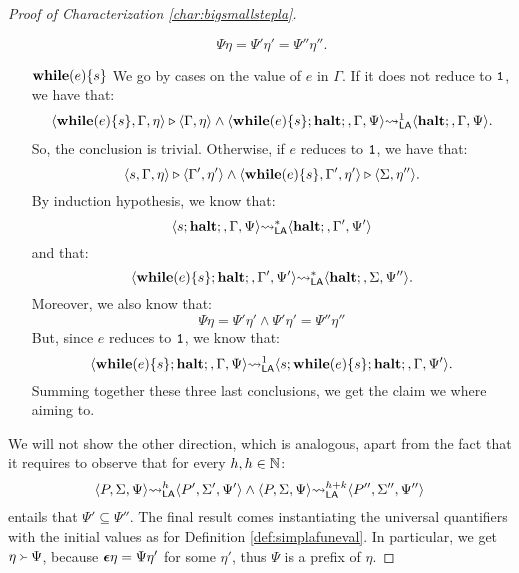 \begin{proof}[Proof of Characterization \ref{char:bigsmallstepla}]
\begin{itemize}
    $$
    \Psi\eta = \Psi'\eta'=\Psi''\eta''.
    $$
    \item[$\mathbf{while}(e)\{s\}$] We go by cases on the value of $e$ in $\Gamma$. If it does
    not reduce to $\mathtt{1}$, we have that:
    $$
    \begin{gathered}
      \langle \mathbf{while}(e)\{s\}, \Gamma, \eta\rangle \triangleright \langle \Gamma, \eta\rangle \land
      \langle \mathbf{while}(e)\{s\};\mathbf{halt};, \Gamma, \Psi\rangle {\leadsto_{\mathsf{LA}}^{1}} \langle \mathbf{halt};, \Gamma, \Psi\rangle.
    \end{gathered}
    $$
    So, the conclusion is trivial.
    Otherwise, if $e$ reduces to $\mathtt{1}$, we have that:
    $$
    \langle s, \Gamma, \eta\rangle \triangleright \langle \Gamma', \eta'\rangle
    \land
    \langle \mathbf{while}(e)\{s\}, \Gamma', \eta'\rangle \triangleright \langle \Sigma, \eta''\rangle.
    $$
    By induction hypothesis, we know that:
    $$
    \langle s;\mathbf{halt};, \Gamma, \Psi\rangle {\leadsto_{\mathsf{LA}}^{*}} \langle \mathbf{halt};, \Gamma', \Psi'\rangle
    $$
    and that:
    $$
    \langle \mathbf{while}(e)\{s\};\mathbf{halt};, \Gamma', \Psi'\rangle {\leadsto_{\mathsf{LA}}^{*}} \langle \mathbf{halt};, \Sigma, \Psi''\rangle.
    $$
    Moreover, we also know that:
    $$
    \Psi\eta = \Psi'\eta' \land \Psi'\eta' = \Psi''\eta''
    $$
    But, since $e$ reduces to $\mathtt{1}$, we know that:
    $$
      \langle \mathbf{while}(e)\{s\};\mathbf{halt};, \Gamma, \Psi\rangle {\leadsto_{\mathsf{LA}}^{1}} \langle s;\mathbf{while}(e)\{s\};\mathbf{halt};, \Gamma, \Psi'\rangle .
    $$
    Summing together these three last conclusions, we get the claim we where aiming to.
  \end{itemize}
  We will not show the other direction, which is analogous, apart from the fact that
  it requires to observe that for every $h, h \in \mathbb{N}$:
  $$
  \langle P, \Sigma, \Psi\rangle {\leadsto_{\mathsf{LA}}^{h}} \langle P', \Sigma', \Psi'\rangle \land
  \langle P, \Sigma, \Psi\rangle {\leadsto_{\mathsf{LA}}^{h+k}} \langle P'', \Sigma'', \Psi''\rangle
  $$
  entails that $\Psi'\subseteq\Psi''$.
  The final result comes instantiating the universal quantifiers with the initial values
  as for Definition \ref{def:simplafuneval}. In particular, we get $\eta \Yright \Psi$,
  because $\bm{\epsilon} \eta = \Psi\eta'$ for some $\eta'$, thus $\Psi$ is a prefix of $\eta$.
\end{proof}

